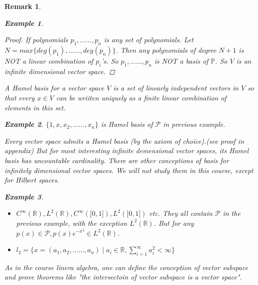\documentclass{article}
\newtheorem*{remark}{Remark}
\newtheorem*{example}{Example}
\begin{document}
\begin{remark}
\begin{example}
\begin{itemize}
            \begin{proof}
                If polynomials $p_1, ......, p_n$ is any set of polynomials. 
                Let $N=max\{deg(p_1), ......, deg(p_n)\}$.
                Then any polynomials of degree $N + 1$ is NOT a linear combination of $p_i$'s.
                So ${p_1, ......, p_n}$ is NOT a basis of $\mathbb{P}$.
                So $V$ is an infinite dimensional vector space.
            \end{proof}
        \end{itemize}
    \end{example}
    A Hamel basis for a vector space $V$ is a set of linearly independent vectors in $V$ so that every $x \in V$
    can be wriiten uniquely as a finite linear combination of elements in this set.
    \begin{example}
        $\{1, x, x_2, ......, x_n\}$ is Hamel basis of $\mathcal{P}$ in previous example.
    \end{example}
    Every vector space admits a Hamel basis (by the axiom of choice).(see proof in appendix)
    But for most interesting infinite demensional vector spaces, its Hamel basis has uncountable cardinality.
    There are other conceptions of basis for infinitely dimensional vector spaces.
    We will not study them in this course, except for Hilbert spaces.
    \begin{example}
        \begin{itemize}  \hfill
            \item $C^{\infty}(\mathbb{R}), L^2(\mathbb{R}), C^{\infty}(\bigl[0, 1\bigr]), L^2(\bigl[0, 1\bigr])$ etc.
            They all contain $\mathcal{P}$ in the previous example, with the exception $L^2(\mathbb{R})$.
            But for any $p(x) \in \mathcal{P}, p(x)e^{-x^2} \in L^2(\mathbb{R})$.
            \item $l_2 = \{x=(a_1, a_2, ......, a_n)\mid a_i \in \mathbb{R}, \sum_{i=1}^{\infty}a_i^2 < \infty\}$
        \end{itemize}
    \end{example}
    As in the course linera algebra, one can define the conception of vector subspace and prove theorems like
    "the intersectoin of vector subspace is a vector space".
\end{remark}
\end{document}
